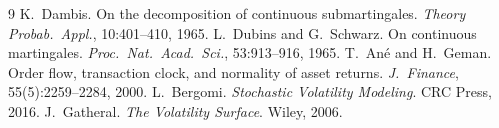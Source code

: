 \documentclass[11pt]{article}
\begin{document}
\begin{thebibliography}{9}
 K.~Dambis.  On the decomposition of continuous
submartingales.  \emph{Theory Probab.\ Appl.}, 10:401--410, 1965.
 L.~Dubins and G.~Schwarz.  On continuous
martingales.  \emph{Proc.\ Nat.\ Acad.\ Sci.}, 53:913--916, 1965.
 T.~An\'e and H.~Geman.  Order flow, transaction
clock, and normality of asset returns.  \emph{J.\ Finance},
55(5):2259--2284, 2000.
 L.~Bergomi.  \emph{Stochastic Volatility
Modeling}.  CRC Press, 2016.
 J.~Gatheral.  \emph{The Volatility Surface}.
Wiley, 2006.
\end{thebibliography}
\end{document}
